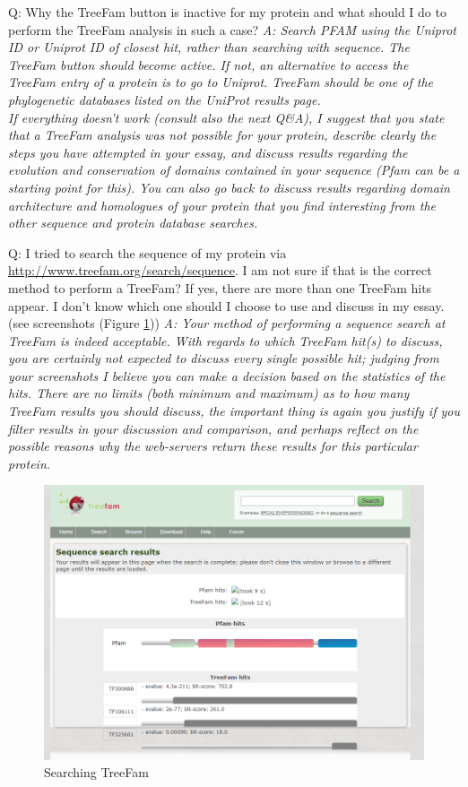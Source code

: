 \documentclass[10pt,a4paper]{article}
\begin{document}
Q:  Why the TreeFam button is inactive for my protein and what should I do to perform the TreeFam analysis in such a case? \newline
\textit{A: Search PFAM using the Uniprot ID or Uniprot ID of closest hit, rather than searching with sequence. The TreeFam button should become active. If not, an alternative to access the TreeFam entry of a protein is to go to Uniprot. TreeFam should be one of the phylogenetic databases listed on the UniProt results page. \\ 
If everything doesn't work (consult also the next Q\&A), I suggest that you state that a TreeFam analysis was not possible for your protein, describe clearly the steps you have attempted in your essay, and discuss results regarding the evolution and conservation of domains contained in your sequence (Pfam can be a starting point for this). You can also go back to discuss results regarding domain architecture and homologues of your protein that you find interesting from the other sequence and protein database searches. } \newline

Q: I tried to search the sequence of my protein via \url{http://www.treefam.org/search/sequence}. I am not sure if that is the correct method to perform a TreeFam? If yes, there are more than one TreeFam hits appear. I don't know which one should I choose to use and discuss in my essay. (see screenshots (Figure \ref{figure:treefamSearch}))
\textit{A: Your method of performing a sequence search at TreeFam is indeed acceptable. With regards to which TreeFam hit(s) to discuss, you are certainly not expected to discuss every single possible hit; judging from your screenshots I believe you can make a decision based on the statistics of the hits. There are no limits (both minimum and maximum) as to how many TreeFam results you should discuss, the important thing is again you justify if you filter results in your discussion and comparison, and perhaps reflect on the possible reasons why the web-servers return these results for this particular protein.} \newline
\begin{figure}[!ht]
\centering \includegraphics[width=1.2\textwidth]{treefam_search.png}
\caption{Searching TreeFam}
\label{figure:treefamSearch}
\end{figure}
\end{document}
